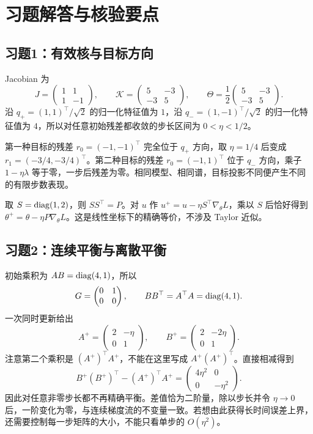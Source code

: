 \section{习题解答与核验要点}
\label{l5:solutions}

\subsection*{习题1：有效核与目标方向}

Jacobian 为
\[
 J=\begin{pmatrix}1&1\\1&-1\end{pmatrix},
 \qquad
 \mathcal K=\begin{pmatrix}5&-3\\-3&5\end{pmatrix},
 \qquad
 \Theta=\frac12\begin{pmatrix}5&-3\\-3&5\end{pmatrix}.
\]
沿 $q_+=(1,1)^\top/\sqrt2$ 的归一化特征值为 $1$，沿
$q_-=(1,-1)^\top/\sqrt2$ 的归一化特征值为 $4$，所以对任意初始残差都收敛的步长区间为 $0<\eta<1/2$。

第一种目标的残差 $r_0=(-1,-1)^\top$ 完全位于 $q_+$ 方向，取
$\eta=1/4$ 后变成 $r_1=(-3/4,-3/4)^\top$。第二种目标的残差
$r_0=(-1,1)^\top$ 位于 $q_-$ 方向，乘子 $1-\eta\lambda$ 等于零，一步后残差为零。相同模型、相同谱，目标投影不同便产生不同的有限步数表现。

取 $S=\operatorname{diag}(1,2)$，则 $SS^\top=P$。对 $u$ 作
$u^+=u-\eta S^\top\nabla_\theta L$，乘以 $S$ 后恰好得到
$\theta^+=\theta-\eta P\nabla_\theta L$。这是线性坐标下的精确等价，不涉及 Taylor 近似。

\subsection*{习题2：连续平衡与离散平衡}

初始乘积为 $AB=\operatorname{diag}(4,1)$，所以
\[
 G=\begin{pmatrix}0&1\\0&0\end{pmatrix},
 \qquad BB^\top=A^\top A=\operatorname{diag}(4,1).
\]
一次同时更新给出
\[
 A^+=\begin{pmatrix}2&-\eta\\0&1\end{pmatrix},
 \qquad
 B^+=\begin{pmatrix}2&-2\eta\\0&1\end{pmatrix}.
\]
注意第二个乘积是 $(A^+)^\top A^+$，不能在这里写成
$A^+(A^+)^\top$。直接相减得到
\[
 B^+(B^+)^\top-(A^+)^\top A^+
 =\begin{pmatrix}4\eta^2&0\\0&-\eta^2\end{pmatrix}.
\]
因此对任意非零步长都不再精确平衡。差值恰为二阶量，除以步长并令
$\eta\to0$ 后，一阶变化为零，与连续梯度流的不变量一致。若想由此获得长时间误差上界，还需要控制每一步矩阵的大小，不能只看单步的 $O(\eta^2)$。

